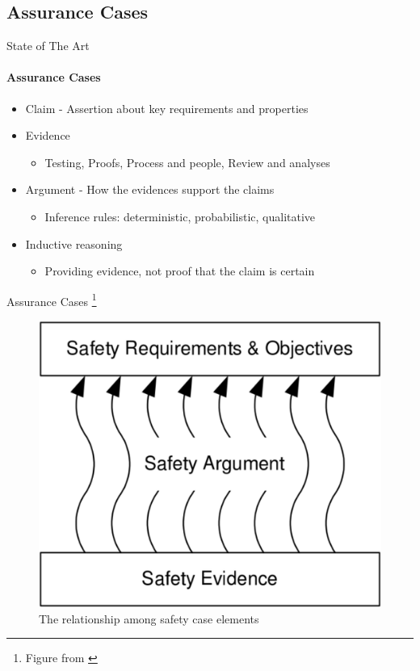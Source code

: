 \documentclass[xcolor=x11names,compress]{beamer}
\renewcommand{\(}{\begin{columns}}
\renewcommand{\)}{\end{columns}}
\newcommand{\<}[1]{\begin{column}{#1}}
\renewcommand{\>}{\end{column}}
\begin{document}
\subsection{Assurance Cases}
\begin{frame}{State of The Art}
\framesubtitle{Assurance Cases}
\begin{itemize}
	\item Claim - Assertion about key requirements and properties
    \item Evidence
	    \begin{itemize}
    		\item Testing, Proofs, Process and people, Review and analyses
	    \end{itemize}
    \item Argument - How the evidences support the claims
    \begin{itemize}
    	\item Inference rules: deterministic, probabilistic, qualitative
    \end{itemize}
    \item Inductive reasoning
    	\begin{itemize}
       	\item Providing evidence, not proof that the claim is certain
      	\end{itemize}
\end{itemize}
\end{frame}


\begin{frame}{Assurance Cases \footnote{Figure from \cite{Kelly:GSN}}}
\begin{figure}
\includegraphics[scale=0.3]{figures/assurance-case}
\caption{The relationship among safety case elements}
\end{figure}
\end{frame}
\end{document}
